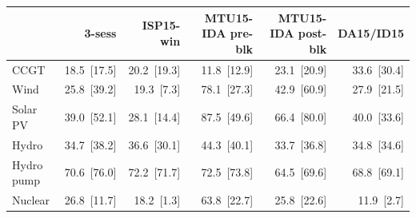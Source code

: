 \begin{tabular}{l r r r r r }
\toprule
 & \textbf{3-sess} & \textbf{ISP15-win} & \textbf{MTU15-IDA pre-blk} & \textbf{MTU15-IDA post-blk} & \textbf{DA15/ID15} \\
\midrule
CCGT & 18.5~{\color{seasoncol}\scriptsize[17.5]} & 20.2~{\color{seasoncol}\scriptsize[19.3]} & 11.8~{\color{seasoncol}\scriptsize[12.9]} & 23.1~{\color{seasoncol}\scriptsize[20.9]} & 33.6~{\color{seasoncol}\scriptsize[30.4]} \\
Wind & 25.8~{\color{seasoncol}\scriptsize[39.2]} & 19.3~{\color{seasoncol}\scriptsize[7.3]} & 78.1~{\color{seasoncol}\scriptsize[27.3]} & 42.9~{\color{seasoncol}\scriptsize[60.9]} & 27.9~{\color{seasoncol}\scriptsize[21.5]} \\
Solar PV & 39.0~{\color{seasoncol}\scriptsize[52.1]} & 28.1~{\color{seasoncol}\scriptsize[14.4]} & 87.5~{\color{seasoncol}\scriptsize[49.6]} & 66.4~{\color{seasoncol}\scriptsize[80.0]} & 40.0~{\color{seasoncol}\scriptsize[33.6]} \\
Hydro & 34.7~{\color{seasoncol}\scriptsize[38.2]} & 36.6~{\color{seasoncol}\scriptsize[30.1]} & 44.3~{\color{seasoncol}\scriptsize[40.1]} & 33.7~{\color{seasoncol}\scriptsize[36.8]} & 34.8~{\color{seasoncol}\scriptsize[34.6]} \\
Hydro pump & 70.6~{\color{seasoncol}\scriptsize[76.0]} & 72.2~{\color{seasoncol}\scriptsize[71.7]} & 72.5~{\color{seasoncol}\scriptsize[73.8]} & 64.5~{\color{seasoncol}\scriptsize[69.6]} & 68.8~{\color{seasoncol}\scriptsize[69.1]} \\
Nuclear & 26.8~{\color{seasoncol}\scriptsize[11.7]} & 18.2~{\color{seasoncol}\scriptsize[1.3]} & 63.8~{\color{seasoncol}\scriptsize[22.7]} & 25.8~{\color{seasoncol}\scriptsize[22.6]} & 11.9~{\color{seasoncol}\scriptsize[2.7]} \\
\bottomrule
\end{tabular}
